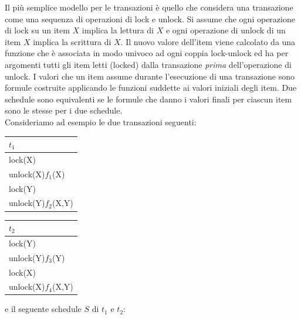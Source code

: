 Il più semplice modello per le transazioni è quello che considera una transazione come una
sequenza di operazioni di lock e unlock. Si assume che ogni operazione di lock su un item $X$ implica
la lettura di $X$ e ogni operazione di unlock di un item $X$ implica la scrittura di $X$. Il nuovo valore
dell'item viene calcolato da una funzione che è associata in modo univoco ad ogni coppia lock-unlock
ed ha per argomenti tutti gli item letti (locked) dalla transazione \emph{prima} dell'operazione di
unlock. I valori che un item assume durante l'esecuzione di una transazione sono formule costruite
applicando le funzioni suddette ai valori iniziali degli item. Due schedule sono equivalenti se le
formule che danno i valori finali per ciascun item sono le stesse per i due schedule.\\
Consideriamo ad esempio le due transazioni seguenti:

\begin{multicols}{2}  

 \begin{tabular}{|l|}
   \hline
   $t_1$\\
   \hline
   lock(X)\\ 
   unlock(X)$f_1$(X)\\ 
   lock(Y)\\ 
   unlock(Y)$f_2$(X,Y)\\ 
  \hline
 \end{tabular}
 
 \begin{tabular}{|l|}
  \hline
   $t_2$\\
   \hline
   lock(Y)\\
   unlock(Y)$f_3$(Y)\\
   lock(X)\\
   unlock(X)$f_4$(X,Y)\\
  \hline
  \end{tabular} 
 \end{multicols}

e il seguente schedule $S$ di $t_1$ e $t_2$:

